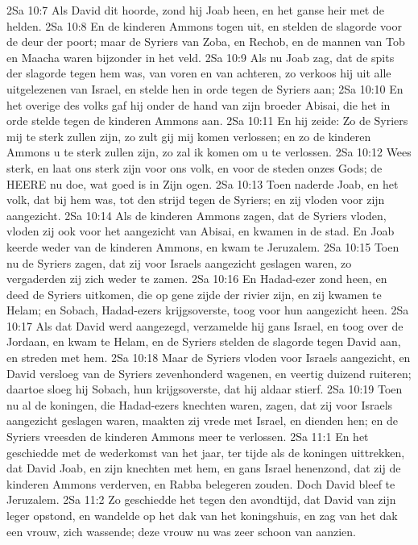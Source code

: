 2Sa 10:7  Als David dit hoorde, zond hij Joab heen, en het ganse heir met de helden.
2Sa 10:8  En de kinderen Ammons togen uit, en stelden de slagorde voor de deur der poort; maar de Syriers van Zoba, en Rechob, en de mannen van Tob en Maacha waren bijzonder in het veld.
2Sa 10:9  Als nu Joab zag, dat de spits der slagorde tegen hem was, van voren en van achteren, zo verkoos hij uit alle uitgelezenen van Israel, en stelde hen in orde tegen de Syriers aan;
2Sa 10:10  En het overige des volks gaf hij onder de hand van zijn broeder Abisai, die het in orde stelde tegen de kinderen Ammons aan.
2Sa 10:11  En hij zeide: Zo de Syriers mij te sterk zullen zijn, zo zult gij mij komen verlossen; en zo de kinderen Ammons u te sterk zullen zijn, zo zal ik komen om u te verlossen.
2Sa 10:12  Wees sterk, en laat ons sterk zijn voor ons volk, en voor de steden onzes Gods; de HEERE nu doe, wat goed is in Zijn ogen.
2Sa 10:13  Toen naderde Joab, en het volk, dat bij hem was, tot den strijd tegen de Syriers; en zij vloden voor zijn aangezicht.
2Sa 10:14  Als de kinderen Ammons zagen, dat de Syriers vloden, vloden zij ook voor het aangezicht van Abisai, en kwamen in de stad. En Joab keerde weder van de kinderen Ammons, en kwam te Jeruzalem.
2Sa 10:15  Toen nu de Syriers zagen, dat zij voor Israels aangezicht geslagen waren, zo vergaderden zij zich weder te zamen.
2Sa 10:16  En Hadad-ezer zond heen, en deed de Syriers uitkomen, die op gene zijde der rivier zijn, en zij kwamen te Helam; en Sobach, Hadad-ezers krijgsoverste, toog voor hun aangezicht heen.
2Sa 10:17  Als dat David werd aangezegd, verzamelde hij gans Israel, en toog over de Jordaan, en kwam te Helam, en de Syriers stelden de slagorde tegen David aan, en streden met hem.
2Sa 10:18  Maar de Syriers vloden voor Israels aangezicht, en David versloeg van de Syriers zevenhonderd wagenen, en veertig duizend ruiteren; daartoe sloeg hij Sobach, hun krijgsoverste, dat hij aldaar stierf.
2Sa 10:19  Toen nu al de koningen, die Hadad-ezers knechten waren, zagen, dat zij voor Israels aangezicht geslagen waren, maakten zij vrede met Israel, en dienden hen; en de Syriers vreesden de kinderen Ammons meer te verlossen.
2Sa 11:1  En het geschiedde met de wederkomst van het jaar, ter tijde als de koningen uittrekken, dat David Joab, en zijn knechten met hem, en gans Israel henenzond, dat zij de kinderen Ammons verderven, en Rabba belegeren zouden. Doch David bleef te Jeruzalem.
2Sa 11:2  Zo geschiedde het tegen den avondtijd, dat David van zijn leger opstond, en wandelde op het dak van het koningshuis, en zag van het dak een vrouw, zich wassende; deze vrouw nu was zeer schoon van aanzien.
